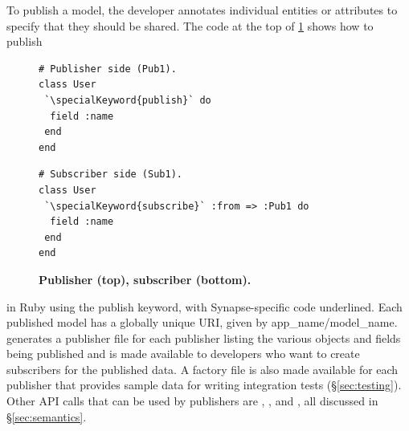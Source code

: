 To publish a model, the developer annotates individual entities or attributes
to specify that they should be shared. The code at the top of
\F\ref{fig:pub-sub} shows how to publish
\begin{figure}
\vspace{-0.2cm}
\begin{minipage}{.18\textwidth}
\begin{lstlisting}[xleftmargin=2pt,framexleftmargin=2pt]
# Publisher side (Pub1).
class User
 `\specialKeyword{publish}` do
  field :name
 end
end
\end{lstlisting}\vspace{-12pt}
\begin{lstlisting}[xleftmargin=2pt,framexleftmargin=2pt]
# Subscriber side (Sub1).
class User
 `\specialKeyword{subscribe}` :from => :Pub1 do
  field :name
 end
end
\end{lstlisting}
\end{minipage}
\vspace{-0.5cm}
\caption{{\footnotesize {\bf Publisher (top), subscriber (bottom).}}}
\vspace{-5pt}
\label{fig:pub-sub}
\end{figure}
in Ruby using the {\code publish} keyword, with Synapse-specific code
underlined.  Each published model has a globally unique URI, given by {\code
app\_name/model\_name}.  \synapse generates a publisher file for each
publisher listing the various objects and fields being published and is made
available to developers who want to create subscribers for the published data.
A factory file is also made available for each publisher that provides sample
data for writing integration tests (\S\ref{sec:testing}).  Other API calls that
can be used by publishers are {}, {}, and {}, all discussed in
\S\ref{sec:semantics}.

